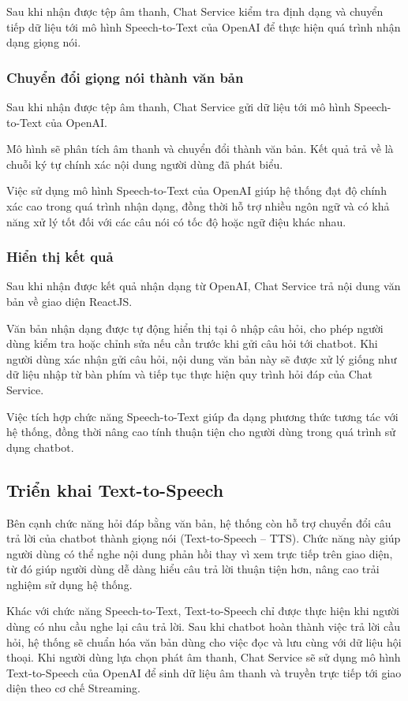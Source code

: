 \documentclass[../DoAn.tex]{subfiles}
\begin{document}
Sau khi nhận được tệp âm thanh, Chat Service kiểm tra định dạng và chuyển tiếp dữ liệu tới mô hình Speech-to-Text của OpenAI để thực hiện quá trình nhận dạng giọng nói.

\subsubsection{Chuyển đổi giọng nói thành văn bản}
Sau khi nhận được tệp âm thanh, Chat Service gửi dữ liệu tới mô hình Speech-to-Text của OpenAI.

Mô hình sẽ phân tích âm thanh và chuyển đổi thành văn bản. Kết quả trả về là chuỗi ký tự chính xác nội dung người dùng đã phát biểu.

Việc sử dụng mô hình Speech-to-Text của OpenAI giúp hệ thống đạt độ chính xác cao trong quá trình nhận dạng, đồng thời hỗ trợ nhiều ngôn ngữ và có khả năng xử lý tốt đối với các câu nói có tốc độ hoặc ngữ điệu khác nhau.

\subsubsection{Hiển thị kết quả}
Sau khi nhận được kết quả nhận dạng từ OpenAI, Chat Service trả nội dung văn bản về giao diện ReactJS.

Văn bản nhận dạng được tự động hiển thị tại ô nhập câu hỏi, cho phép người dùng kiểm tra hoặc chỉnh sửa nếu cần trước khi gửi câu hỏi tới chatbot. Khi người dùng xác nhận gửi câu hỏi, nội dung văn bản này sẽ được xử lý giống như dữ liệu nhập từ bàn phím và tiếp tục thực hiện quy trình hỏi đáp của Chat Service.

Việc tích hợp chức năng Speech-to-Text giúp đa dạng phương thức tương tác với hệ thống, đồng thời nâng cao tính thuận tiện cho người dùng trong quá trình sử dụng chatbot.

\subsection{Triển khai Text-to-Speech}
Bên cạnh chức năng hỏi đáp bằng văn bản, hệ thống còn hỗ trợ chuyển đổi câu trả lời của chatbot thành giọng nói (Text-to-Speech -- TTS). Chức năng này giúp người dùng có thể nghe nội dung phản hồi thay vì xem trực tiếp trên giao diện, từ đó giúp người dùng dễ dàng hiểu câu trả lời thuận tiện hơn, nâng cao trải nghiệm sử dụng hệ thống.

Khác với chức năng Speech-to-Text, Text-to-Speech chỉ được thực hiện khi người dùng có nhu cầu nghe lại câu trả lời. Sau khi chatbot hoàn thành việc trả lời cầu hỏi, hệ thống sẽ chuẩn hóa văn bản dùng cho việc đọc và lưu cùng với dữ liệu hội thoại. Khi người dùng lựa chọn phát âm thanh, Chat Service sẽ sử dụng mô hình Text-to-Speech của OpenAI để sinh dữ liệu âm thanh và truyền trực tiếp tới giao diện theo cơ chế Streaming.
\end{document}
